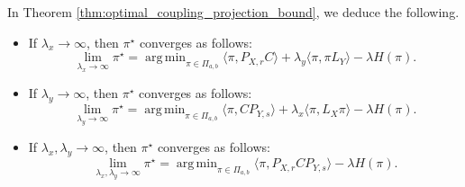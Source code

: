 \documentclass[10pt,a4paper]{amsart}
\DeclareMathOperator*{\argmin}{arg\,min}
\begin{document}
\begin{proposition}
    In Theorem \ref{thm:optimal_coupling_projection_bound}, we deduce the following.
    \begin{itemize}
        \item[(i)] If $\lambda_x \to \infty$, then $\pi^\star$ converges as follows:
        \begin{equation*}
            \lim_{\lambda_x \to \infty} \pi^\star = \argmin_{\pi \in \Pi_{a, b}} \langle \pi, P_{X, r} C \rangle + \lambda_y \langle \pi, \pi L_Y \rangle - \lambda H(\pi).
        \end{equation*}
        \item[(ii)] If $\lambda_y \to \infty$, then $\pi^\star$ converges as follows:
        \begin{equation*}
            \lim_{\lambda_y \to \infty} \pi^\star = \argmin_{\pi \in \Pi_{a, b}} \langle \pi, C P_{Y, s} \rangle + \lambda_x \langle \pi, L_X \pi \rangle - \lambda H(\pi).
        \end{equation*}
        \item[(iii)] If $\lambda_x, \lambda_y \to \infty$, then $\pi^\star$ converges as follows:
        \begin{equation*}
            \lim_{\lambda_x, \lambda_y \to \infty} \pi^\star = \argmin_{\pi \in \Pi_{a, b}} \langle \pi, P_{X, r} C P_{Y, s} \rangle - \lambda H(\pi).
        \end{equation*}
    \end{itemize}
\end{proposition}
\end{document}
